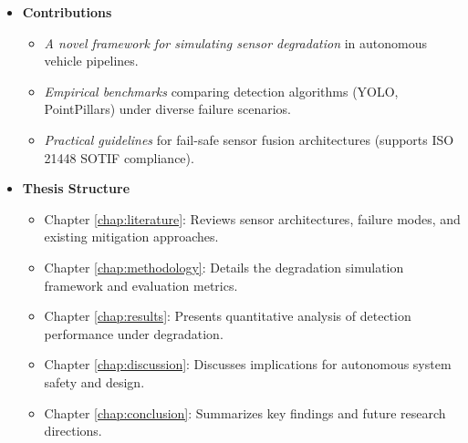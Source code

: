 \begin{itemize}
    \item \textbf{Contributions}
    \begin{itemize}
        \item \textit{A novel framework for simulating sensor degradation} in autonomous vehicle pipelines.
        \item \textit{Empirical benchmarks} comparing detection algorithms (YOLO, PointPillars) under diverse failure scenarios.
        \item \textit{Practical guidelines} for fail-safe sensor fusion architectures (supports ISO 21448 SOTIF compliance).
    \end{itemize}
    
    \item \textbf{Thesis Structure}
    \begin{itemize}
        \item Chapter \ref{chap:literature}: Reviews sensor architectures, failure modes, and existing mitigation approaches.
        \item Chapter \ref{chap:methodology}: Details the degradation simulation framework and evaluation metrics.
        \item Chapter \ref{chap:results}: Presents quantitative analysis of detection performance under degradation.
        \item Chapter \ref{chap:discussion}: Discusses implications for autonomous system safety and design.
        \item Chapter \ref{chap:conclusion}: Summarizes key findings and future research directions.
    \end{itemize}
\end{itemize}


